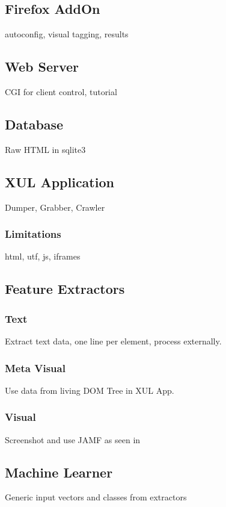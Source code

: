 \subsection{Firefox AddOn}

autoconfig, visual tagging, results

\subsection{Web Server}

CGI for client control, tutorial

\subsection{Database}

Raw HTML in sqlite3

\subsection{XUL Application}

Dumper, Grabber, Crawler

\subsubsection{Limitations}

html, utf, js, iframes

\subsection{Feature Extractors}

\subsubsection{Text}

Extract text data, one line per element, process externally.

\subsubsection{Meta Visual}

Use data from living DOM Tree in XUL App.

\subsubsection{Visual}

Screenshot and use JAMF as seen in \cite{Steger08}

\subsection{Machine Learner}

Generic input vectors and classes from extractors

